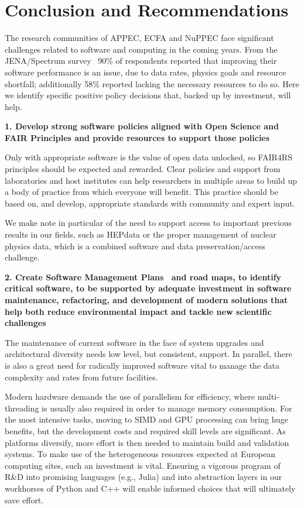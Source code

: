 \section{Conclusion and Recommendations}

The research communities of APPEC, ECFA and NuPPEC face significant challenges related to software and computing in the coming years. From the JENA/Spectrum survey~\cite{JENA-Spectrum-Survey-Report} 90\% of respondents reported that improving their software performance is an issue, due to data rates, physics goals and resource shortfall; additionally 58\% reported lacking the necessary resources to do so. Here we identify specific positive policy decisions that, backed up by investment, will help.

{\bf 1. Develop strong software policies aligned with Open Science and FAIR Principles and provide resources to support those policies}

Only with appropriate software is the value of open data unlocked, so FAIR4RS~\cite{Barker2022} principles should be expected and rewarded. Clear policies and support from laboratories and host institutes can help researchers in multiple areas to build up a body of practice from which everyone will benefit. This practice should be based on, and develop, appropriate standards with community and expert input.

We make note in particular of the need to support access to important previous results in our fields, such as HEPdata or the proper management of nuclear physics data, which is a combined software and data preservation/access challenge.

{\bf 2. Create Software Management Plans~\cite{SMPs} and road maps, to identify critical software, to be supported by adequate investment in software maintenance, refactoring, and development of modern solutions that help both reduce environmental impact and tackle new scientific challenges}

The maintenance of current software in the face of system upgrades and architectural diversity needs low level, but consistent, support. In parallel, there is also a great need for radically improved software vital to manage the data complexity and rates from future facilities.

Modern hardware demands the use of parallelism for efficiency, where multi-threading is usually also required in order to manage memory consumption. For the most intensive tasks, moving to SIMD and GPU processing can bring huge benefits, but the development costs and required skill levels are significant. As platforms diversify, more effort is then needed to maintain build and validation systems. To make use of the heterogeneous resources expected at European computing sites, such an investment is vital. Ensuring a vigorous program of R\&D into promising languages (e.g., Julia) and into abstraction layers in our workhorses of Python and C++ will enable informed choices that will ultimately save effort.

